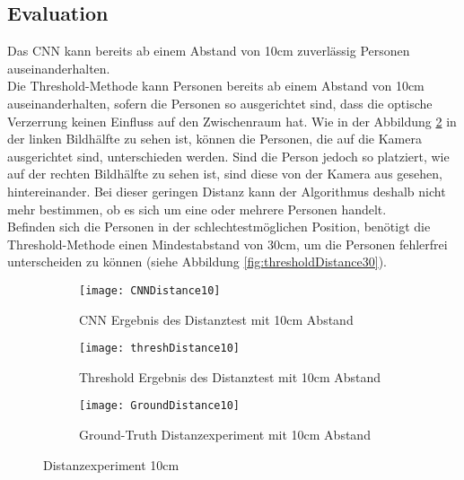 \subsection{Evaluation}


Das \gls{CNN} kann bereits ab einem Abstand von 10cm zuverlässig Personen auseinanderhalten.\\
Die Threshold-Methode kann Personen bereits ab einem Abstand von 10cm auseinanderhalten, sofern die Personen so ausgerichtet sind, dass die optische Verzerrung keinen Einfluss auf den Zwischenraum hat. Wie in der Abbildung \ref{fig:thresholdDistance10} in der linken Bildhälfte zu sehen ist, können die Personen, die auf die Kamera ausgerichtet sind, unterschieden werden. Sind die Person jedoch so platziert, wie auf der rechten Bildhälfte zu sehen ist, sind diese von der Kamera aus gesehen, hintereinander. Bei dieser geringen Distanz kann der Algorithmus deshalb nicht mehr bestimmen, ob es sich um eine oder mehrere Personen handelt.\\
Befinden sich die Personen in der schlechtestmöglichen Position, benötigt die Threshold-Methode einen Mindestabstand von 30cm, um die Personen fehlerfrei unterscheiden zu können (siehe Abbildung \ref{fig:thresholdDistance30}).

\begin{figure}[H]
	\begin{subfigure}{.45\linewidth}
		\centering
		\texttt{[image: CNNDistance10]}
		\caption{\gls{CNN} Ergebnis des Distanztest mit 10cm Abstand}
		\label{fig:cnnDistance10}
	\end{subfigure}\hfill%
	\begin{subfigure}{.45\linewidth}
		\centering
		\texttt{[image: threshDistance10]}
		\caption{Threshold Ergebnis des Distanztest mit 10cm Abstand}
		\label{fig:thresholdDistance10}
	\end{subfigure}\hfill
	\begin{subfigure}{\linewidth}
		\centering
		\texttt{[image: GroundDistance10]}
		\caption{Ground-Truth Distanzexperiment mit 10cm Abstand}
		\label{fig:groundDistance10}
	\end{subfigure}
	\caption{Distanzexperiment 10cm}
	\label{fig:Distance10}
\end{figure}

